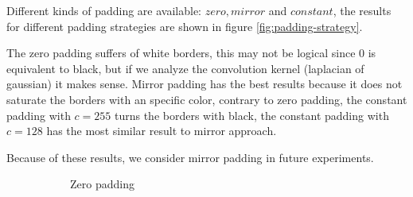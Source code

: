 Different kinds of padding are available: $zero, mirror$ and $constant$, the results for different padding strategies are shown in figure \ref{fig:padding-strategy}.

The zero padding suffers of white borders, this may not be logical since 0 is equivalent to black, but if we analyze the convolution kernel (laplacian of gaussian) it makes sense. Mirror padding has the best results because it does not saturate the borders with an specific color, contrary to zero padding, the constant padding with $c=255$ turns the borders with black, the constant padding with $c=128$ has the most similar result to mirror approach.

Because of these results, we consider mirror padding in future experiments.

\begin{figure}[h!]
\centering
\begin{subfigure}{0.25\textwidth}
  \centering
  \caption{Zero padding}
\end{subfigure}%
\begin{subfigure}{0.25\textwidth}
  \centering

\end{subfigure}
\end{figure}
